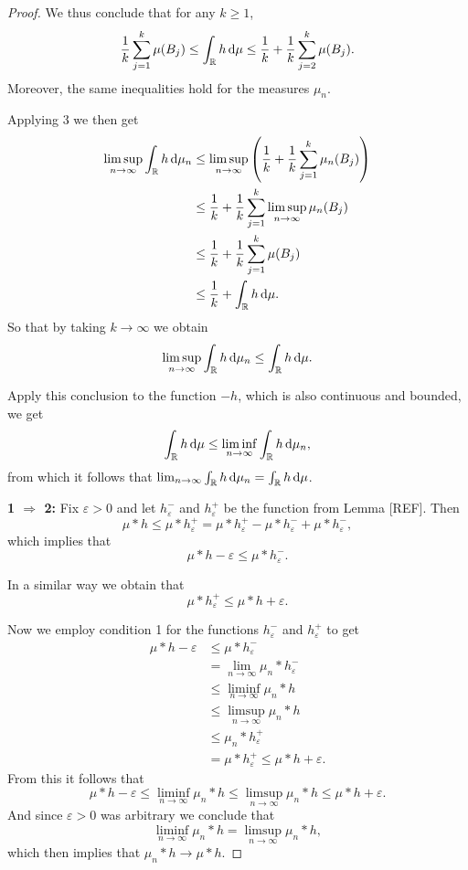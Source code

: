 \begin{proof}
We thus conclude that for any $k \ge 1$,
\begin{equation}
	\frac{1}{k} \sum_{j = 1}^k \mu(B_j) \le \int_{\mathbb R} h \, \mathrm{d} \mu \le
	\frac{1}{k} + \frac{1}{k} \sum_{j = 2}^{k} \mu(B_j).
\end{equation}
Moreover, the same inequalities hold for the measures $\mu_n$.

Applying 3 we then get
\begin{align*}
	\limsup_{n \to \infty} \int_{\mathbb R} h \, \mathrm{d} \mu_n
	&\le  \limsup_{n \to \infty} \left(\frac{1}{k} + \frac{1}{k} \sum_{j = 1}^k \mu_n(B_j) \right)\\
	&\le \frac{1}{k} + \frac{1}{k} \sum_{j = 1}^k \limsup_{n \to \infty} \mu_n(B_j)\\
	&\le \frac{1}{k} + \frac{1}{k} \sum_{j = 1}^k \mu(B_j) \\
	&\le \frac{1}{k} + \int_{\mathbb R} h \, \mathrm{d} \mu.
\end{align*}
So that by taking $k \to \infty$ we obtain
\[
	\limsup_{n \to \infty} \int_{\mathbb R} h \, \mathrm{d} \mu_n \le \int_{\mathbb R} h \, \mathrm{d} \mu.
\]

Apply this conclusion to the function $-h$, which is also continuous and bounded, we get
\[
	\int_{\mathbb R} h \, \mathrm{d} \mu \le \liminf_{n \to \infty} \int_{\mathbb R} h \, \mathrm{d} \mu_n,
\]
from which it follows that $\lim_{n \to \infty} \int_{\mathbb R} h \, \mathrm{d} \mu_n = \int_{\mathbb R} h \, \mathrm{d} \mu$.



\textbf{1 $\Rightarrow$ 2:} Fix $\varepsilon > 0$ and let $h^-_\varepsilon$ and $h^+_\varepsilon$ be the function from Lemma [REF]. Then
\[
	\mu \ast h \le \mu \ast h^+_\varepsilon = \mu \ast h^+_\varepsilon - \mu \ast h^-_\varepsilon + \mu \ast h^-_\varepsilon,
\]
which implies that
\[
	 \mu \ast h -\varepsilon \le \mu \ast h^-_\varepsilon.
\]

In a similar way we obtain that
\[
	\mu \ast h^+_\varepsilon \le \mu \ast h +\varepsilon.
\]

Now we employ condition 1 for the functions $h^-_\varepsilon$ and $h^+_\varepsilon$ to get
\begin{align*}
	\mu \ast h -\varepsilon &\le \mu \ast h^-_\varepsilon\\
	&= \lim_{n \to \infty} \mu_n \ast h^-_\varepsilon\\
	&\le \liminf_{n \to \infty} \mu_n \ast h \\
	&\le \limsup_{n \to \infty} \mu_n \ast h\\
	&\le \mu_n \ast h^+_\varepsilon\\
	&= \mu \ast h^+_\varepsilon \le \mu \ast h +\varepsilon.
\end{align*}
From this it follows that
\[
	\mu \ast h -\varepsilon \le \liminf_{n \to \infty} \mu_n \ast h
	\le \limsup_{n \to \infty} \mu_n \ast h \le \mu \ast h +\varepsilon.
\]
And since $\varepsilon > 0$ was arbitrary we conclude that
\[
	\liminf_{n \to \infty} \mu_n \ast h = \limsup_{n \to \infty} \mu_n \ast h,
\]
which then implies that $\mu_n \ast h \to \mu \ast h$.


\end{proof}
